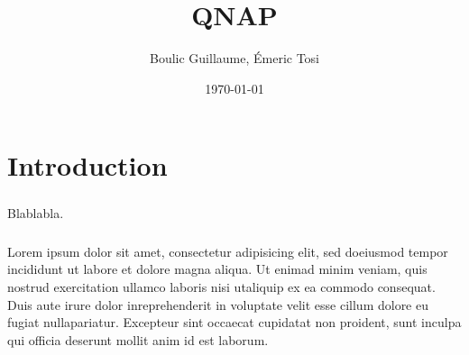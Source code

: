 \documentclass[a4paper,11pt]{report}
\title{QNAP}
\author{Boulic Guillaume, Émeric Tosi}
\date{\today}
\begin{document}
    \maketitle{} %



    \setcounter{tocdepth}{1} %
    \renewcommand{\contentsname}{Sommaire} %
    \tableofcontents{} %
    \clearpage



\chapter*{Introduction}
        \paragraph{}
Blablabla.
        \paragraph{}
Lorem ipsum dolor sit amet, consectetur adipisicing elit, sed doeiusmod tempor incididunt ut labore et dolore magna aliqua.
Ut enimad minim veniam, quis nostrud exercitation ullamco laboris nisi utaliquip ex ea commodo consequat.
Duis aute irure dolor inreprehenderit in voluptate velit esse cillum dolore eu fugiat nullapariatur.
Excepteur sint occaecat cupidatat non proident, sunt inculpa qui officia deserunt mollit anim id est laborum.
    \clearpage


%

\clearpage


%

\clearpage


%

\clearpage


%
\end{document}
